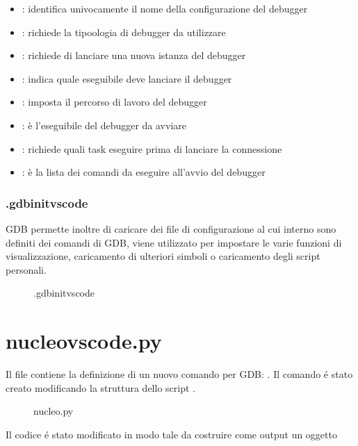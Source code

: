 \begin{itemize}
    \item {}: identifica univocamente il nome della configurazione del debugger
    \item {}: richiede la tipoologia di debugger da utilizzare
    \item {}: richiede di lanciare una nuova istanza del debugger
    \item {}: indica quale eseguibile deve lanciare il debugger
    \item {}: imposta il percorso di lavoro del debugger
    \item {}: è l'eseguibile del debugger da avviare
    \item {}: richiede quali task eseguire prima di lanciare la connessione
    \item {}: è la lista dei comandi da eseguire all'avvio del debugger
\end{itemize}

\subsubsection*{.gdbinitvscode}
GDB permette inoltre di caricare dei file di configurazione al cui interno sono definiti dei comandi di GDB, viene utilizzato per impostare le varie funzioni di visualizzazione, caricamento di ulteriori simboli o caricamento degli script personali. 

\begin{figure}[H]
    
    \caption{.gdbinitvscode}
\end{figure}

\section{nucleo\textunderscore vscode.py}

Il file  contiene la definizione di un nuovo comando per GDB: . Il comando é stato creato modificando la struttura dello script . 

\begin{figure}[H]
    
    \caption{nucleo.py}
\end{figure}

Il codice é stato modificato in modo tale da costruire come output un oggetto 

